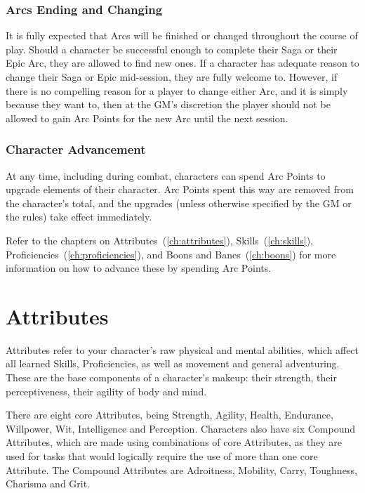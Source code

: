 \documentclass[oneside,11pt,english]{book}
\begin{document}
 
\subsection{Arcs Ending and Changing}
It is fully expected that Arcs will be finished or changed throughout the course of play. Should a character 
be successful enough to complete their Saga or their Epic Arc, they are allowed to find new ones. If a 
character has adequate reason to change their Saga or Epic mid-session, they are fully welcome to. 
However, if there is no compelling reason for a player to change either Arc, and it is simply because they 
want to, then at the GM’s discretion the player should not be allowed to gain Arc Points for the new Arc 
until the next session. 


\subsection{Character Advancement}
At any time, including during combat, characters can spend Arc Points to upgrade elements of their 
character. Arc Points spent this way are removed from the character’s total, and the upgrades (unless 
otherwise specified by the GM or the rules) take effect immediately. 


Refer to the chapters on Attributes~(\autoref{ch:attributes}), Skills~(\autoref{ch:skills}), Proficiencies~(\autoref{ch:proficiencies}), and Boons and Banes~(\autoref{ch:boons}) for more information on how to advance these by spending Arc Points. 
\chapter{Attributes}\label{ch:attributes}
\startcontents[chapters]
\clearpage
Attributes refer to your character’s raw physical and mental abilities, which affect all learned Skills, 
Proficiencies, as well as movement and general adventuring. These are the base components of a 
character’s makeup: their strength, their perceptiveness, their agility of body and mind. 


There are eight core Attributes, being Strength, Agility, Health, Endurance, Willpower, Wit, Intelligence 
and Perception. Characters also have six Compound Attributes, which are made using combinations of 
core Attributes, as they are used for tasks that would logically require the use of more than one core 
Attribute. The Compound Attributes are Adroitness, Mobility, Carry, Toughness, Charisma and Grit. 
 
\end{document}
